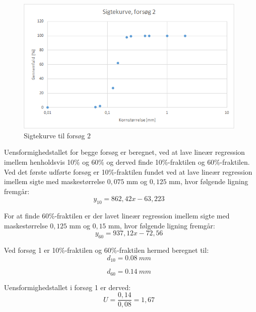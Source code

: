 \begin{figure}[htbp]
		\centering
		\includegraphics[width=1.0\textwidth]{billeder/sigtekurve2.png}
		\caption{Sigtekurve til forsøg 2}
		\label{fig:sigtekurve2}
\end{figure}

Uensformighedstallet for begge forsøg er beregnet, ved at lave lineær regression imellem henholdsvis 10\% og 60\% og derved finde 10\%-fraktilen og 60\%-fraktilen.
\newline
\newline
Ved det første udførte forsøg er 10\%-fraktilen fundet ved at lave lineær regression imellem sigte med maskestørrelse $0,\!075$ mm og $0,\!125$ mm, hvor følgende ligning fremgår: 
\begin{equation}
	y_{10} = 862,\!42x - 63,\!223
\end{equation}

For at finde 60\%-fraktilen er der lavet lineær regression imellem sigte med maskestørrelse $0,\!125$ mm og $0,\!15$ mm, hvor følgende ligning fremgår:
\begin{equation}
	y_{60} = 937,\!12x - 72,\!56
\end{equation}

Ved forsøg 1 er 10\%-fraktilen og 60\%-fraktilen hermed beregnet til: 
\begin{equation}
	d_{10} = \SI{0,08}{mm}
\end{equation} 

\begin{equation}
d_{60} = \SI{0,14}{mm}
\end{equation}

Uensformighedstallet i forsøg 1 er derved:
\begin{equation}
	U = \frac{0,\!14}{0,\!08} = 1,\!67
\end{equation}

